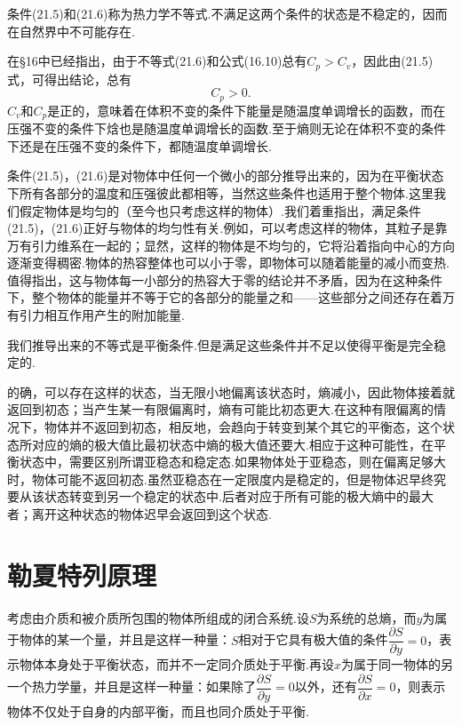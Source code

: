 条件(21.5)和(21.6)称为热力学不等式.不满足这两个条件的状态是不稳定的，因而在自然界中不可能存在.

在§16中已经指出，由于不等式(21.6)和公式(16.10)总有$C_p>C_v$，因此由(21.5)式，可得出结论，总有
\begin{equation}
  C_p>0.
\end{equation}
$C_v$和$C_p$是正的，意味着在体积不变的条件下能量是随温度单调增长的函数，而在压强不变的条件下焓也是随温度单调增长的函数.至于熵则无论在体积不变的条件下还是在压强不变的条件下，都随温度单调增长.

条件(21.5)，(21.6)是对物体中任何一个微小的部分推导出来的，因为在平衡状态下所有各部分的温度和压强彼此都相等，当然这些条件也适用于整个物体.这里我们假定物体是均匀的（至今也只考虑这样的物体）.我们着重指出，满足条件(21.5)，(21.6)正好与物体的均匀性有关.例如，可以考虑这样的物体，其粒子是靠万有引力维系在一起的；显然，这样的物体是不均匀的，它将沿着指向中心的方向逐渐变得稠密.物体的热容整体也可以小于零，即物体可以随着能量的减小而变热.值得指出，这与物体每一小部分的热容大于零的结论并不矛盾，因为在这种条件下，整个物体的能量并不等于它的各部分的能量之和——这些部分之间还存在着万有引力相互作用产生的附加能量.

我们推导出来的不等式是平衡条件.但是满足这些条件并不足以使得平衡是完全稳定的.

的确，可以存在这样的状态，当无限小地偏离该状态时，熵减小，因此物体接着就返回到初态；当产生某一有限偏离时，熵有可能比初态更大.在这种有限偏离的情况下，物体并不返回到初态，相反地，会趋向于转变到某个其它的平衡态，这个状态所对应的熵的极大值比最初状态中熵的极大值还要大.相应于这种可能性，在平衡状态中，需要区别所谓亚稳态和稳定态.如果物体处于亚稳态，则在偏离足够大时，物体可能不返回初态.虽然亚稳态在一定限度内是稳定的，但是物体迟早终究要从该状态转变到另一个稳定的状态中.后者对应于所有可能的极大熵中的最大者；离开这种状态的物体迟早会返回到这个状态.

\section{勒夏特列原理}

考虑由介质和被介质所包围的物体所组成的闭合系统.设$S$为系统的总熵，而$y$为属于物体的某一个量，并且是这样一种量：$S$相对于它具有极大值的条件$\dfrac{\partial S}{\partial y}=0$，表示物体本身处于平衡状态，而并不一定同介质处于平衡.再设$x$为属于同一物体的另一个热力学量，并且是这样一种量：如果除了$\dfrac{\partial S}{\partial y}=0$以外，还有$\dfrac{\partial S}{\partial x}=0$，则表示物体不仅处于自身的内部平衡，而且也同介质处于平衡.

